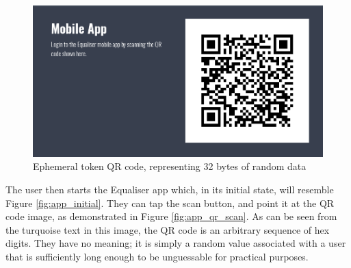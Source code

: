 \documentclass[12pt,a4paper]{bhamdissertation}
\begin{document}
\begin{figure}[!htbp]
    \centering
    \includegraphics[width=1\linewidth]{img/ephemeral_qr_code.png}
    \caption{Ephemeral token QR code, representing 32 bytes of random data}
    \label{fig:ephemeral_qr_code}
\end{figure}

The user then starts the Equaliser app which, in its initial state, will resemble Figure \ref{fig:app_initial}. They can tap the scan button, and point it at the QR code image, as demonstrated in Figure \ref{fig:app_qr_scan}. As can be seen from the turquoise text in this image, the QR code is an arbitrary sequence of hex digits. They have no meaning; it is simply a random value associated with a user that is sufficiently long enough to be unguessable for practical purposes.
\end{document}
